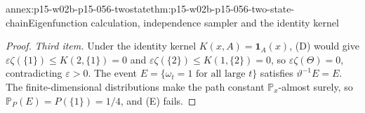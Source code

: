 \begin{annexitem}{annex:p15-w02b-p15-056-twostate}{thm:p15-w02b-p15-056-two-state-chain}{Eigenfunction calculation, independence sampler and the identity kernel}
\begin{proof}
\emph{Third item.} Under the identity kernel \(K(x,A)=\mathbf 1_A(x)\),
(D) would give \(\varepsilon\zeta(\{1\})\leq K(2,\{1\})=0\) and
\(\varepsilon\zeta(\{2\})\leq K(1,\{2\})=0\), so \(\varepsilon\zeta(\Theta)=0\),
contradicting \(\varepsilon>0\). The event
\(E=\{\omega_t=1\text{ for all large }t\}\) satisfies
\(\vartheta^{-1}E=E\). The finite-dimensional distributions make the path
constant \(\mathbb P_x\)-almost surely, so
\(\mathbb P_P(E)=P(\{1\})=1/4\), and (E) fails.
\end{proof}
\end{annexitem}
